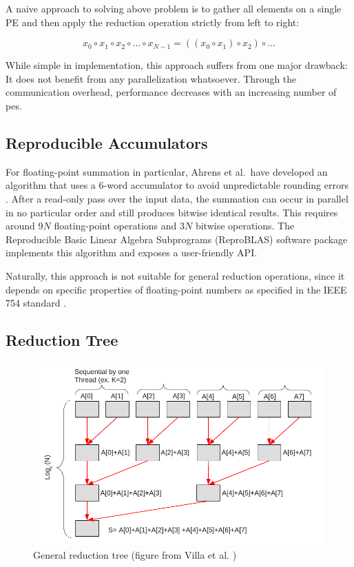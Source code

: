 A naive approach to solving above problem is to gather all elements on a single PE and then apply the reduction operation strictly from left to right:

\begin{equation}
x_0 \circ x_1 \circ x_2 \circ \ldots  \circ x_{N-1} = ((x_0 \circ x_1) \circ x_2) \circ \ldots
\end{equation}

While simple in implementation, this approach suffers from one major drawback:
It does not benefit from any parallelization whatsoever.
Through the communication overhead, performance decreases with an increasing number of \glspl{pe}.


\subsection{Reproducible Accumulators}
\label{sec:Reproducible Accumulators}
For floating-point summation in particular, Ahrens et al.\ have developed an algorithm that uses a 6-word accumulator
to avoid unpredictable rounding errors \cite{ahrens_algorithms_2020}. After a read-only pass over the input data,
the summation can occur in parallel in no particular order and still produces bitwise identical results.
This requires around $9N$ floating-point operations and $3N$ bitwise operations.
The Reproducible Basic Linear Algebra Subprograms (ReproBLAS) software package implements this algorithm and
exposes a user-friendly API.\@

Naturally, this approach is not suitable for general reduction operations, since it depends on specific properties of floating-point numbers as specified in the IEEE 754 standard \cite{noauthor_ieee_nodate-1}.


\subsection{Reduction Tree}
\label{sec:ReductionTree}

\begin{figure}[H]
\centering
\includegraphics[scale=0.7]{figures/villa_et_al_reduction_tree.pdf}
\caption{General reduction tree (figure from Villa et al. \cite{villa_effects_2009})}
\label{fig:villa_reduction_tree}
\end{figure}



